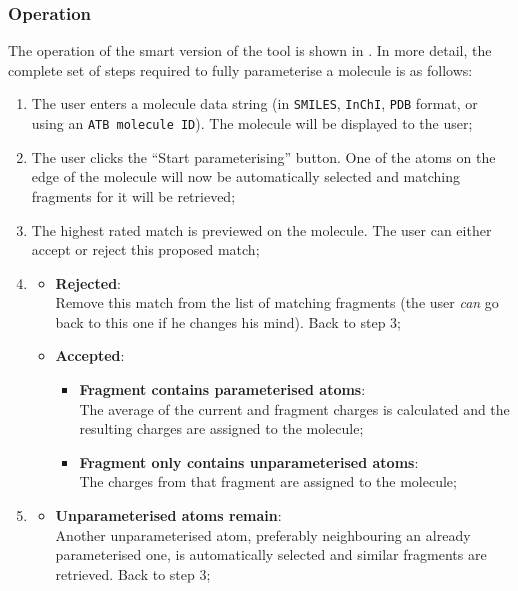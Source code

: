 \subsubsection{Operation}
The operation of the smart version of the tool is shown in . In more detail, the complete set of steps required to fully parameterise a molecule is as follows:
\begin{enumerate}[itemsep=.1em, parsep=.2em, topsep=0em]
\item The user enters a molecule data string (in \verb|SMILES|, \verb|InChI|, \verb|PDB| format, or using an \verb|ATB molecule ID|). The molecule will be displayed to the user;
\item The user clicks the ``Start parameterising'' button. One of the atoms on the edge of the molecule will now be automatically selected and matching fragments for it will be retrieved;
\item The highest rated match is previewed on the molecule. The user can either accept or reject this proposed match;
\item
  \begin{itemize}[leftmargin=0cm, itemsep=.1em, parsep=.1em]
  \item[]{\bf Rejected}:\\Remove this match from the list of matching fragments (the user \emph{can} go back to this one if he changes his mind). Back to step 3;
  \item[] {\bf Accepted}:
    \begin{itemize}[leftmargin=.5cm, itemsep=.1em, parsep=.1em]
    \item[]{\bf Fragment contains parameterised atoms}:\\
      The average of the current and fragment charges is calculated and the resulting charges are assigned to the molecule;
    \item[] {\bf Fragment only contains unparameterised atoms}:\\
      The charges from that fragment are assigned to the molecule;
    \end{itemize}
  \end{itemize}
\item
  \begin{itemize}[leftmargin=0cm, itemsep=.1em, parsep=.1em]
  \item[]{\bf Unparameterised atoms remain}:\\Another unparameterised atom, preferably neighbouring an already parameterised one, is automatically selected and similar fragments are retrieved. Back to step 3;

\end{itemize}
\end{enumerate}
